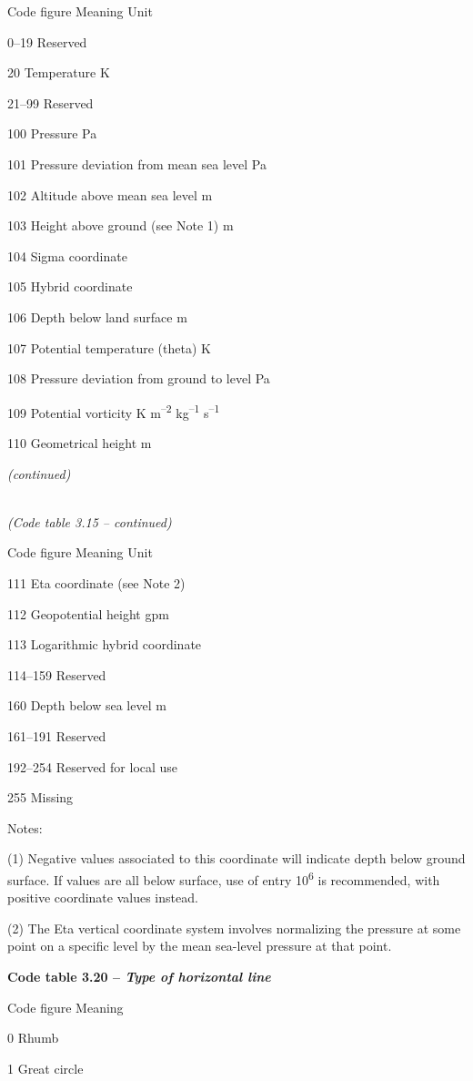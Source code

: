 Code figure Meaning Unit

0--19 Reserved

20 Temperature K

21--99 Reserved

100 Pressure Pa

101 Pressure deviation from mean sea level Pa

102 Altitude above mean sea level m

103 Height above ground (see Note 1) m

104 Sigma coordinate

105 Hybrid coordinate

106 Depth below land surface m

107 Potential temperature (theta) K

108 Pressure deviation from ground to level Pa

109 Potential vorticity K m\textsuperscript{--2} kg\textsuperscript{--1} s\textsuperscript{--1}

110 Geometrical height m

\emph{(continued)}

\emph{\\
(Code table 3.15 -- continued)}

Code figure Meaning Unit

111 Eta coordinate (see Note 2)

112 Geopotential height gpm

113 Logarithmic hybrid coordinate

114--159 Reserved

160 Depth below sea level m

161--191 Reserved

192--254 Reserved for local use

255 Missing

Notes:

(1) Negative values associated to this coordinate will indicate depth below ground surface. If values are all below surface, use of entry 10\textsuperscript{6} is recommended, with positive coordinate values instead.

(2) The Eta vertical coordinate system involves normalizing the pressure at some point on a specific level by the mean sea-level pressure at that point.

\textbf{Code table 3.20 -- \emph{Type of horizontal line}}

Code figure Meaning

0 Rhumb

1 Great circle

